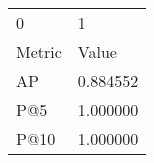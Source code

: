 \begin{tabular}{ll}
0 & 1 \\
Metric & Value \\
AP & 0.884552 \\
P@5 & 1.000000 \\
P@10 & 1.000000 \\
\end{tabular}
